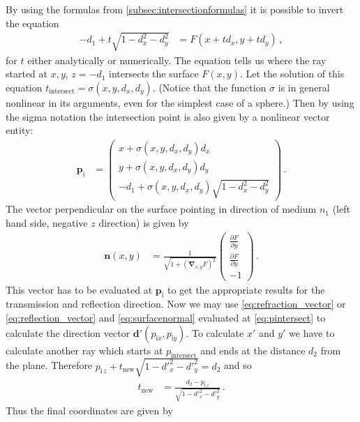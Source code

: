 \documentclass[12pt,a4paper,twoside,openright,BCOR10mm,headsepline,titlepage,abstracton,chapterprefix,final]{scrreprt}
\newcommand\Vector[1]{{\mathbf{#1}}}
\begin{document}
By using the formulas from \ref{subsec:intersectionformulas} it is possible to invert the equation 
\begin{align}
-d_1 + t \sqrt{1-d_x^2-d_y^2} &= F(x + t d_x, y + t d_y)\,,\label{eq:genintersection} 
\end{align}
for $t$ either analytically or numerically. The equation tells
us where the ray started at $x, y$, $z = -d_1$ intersects the surface $F(x, y)$. Let the solution
of this equation $t_\text{intersect} = \sigma(x, y, d_x, d_y)$. (Notice that the function $\sigma$
is in general nonlinear in its arguments, even for the simplest case of a sphere.) Then by using the 
sigma notation the intersection point is also given by a nonlinear vector entity:
\begin{align}
 \Vector{p}_\text{i} &= \begin{pmatrix} x + \sigma(x,y,d_x,d_y) d_x \\ y + \sigma(x,y,d_x,d_y) d_y \\ -d_1 + \sigma(x,y,d_x,d_y) \sqrt{1 - d_x^2 - d_y^2} \end{pmatrix}\,.\label{eq:pintersect}
\end{align}
The vector perpendicular on the surface pointing in direction of medium $n_1$ (left hand side, negative $z$ direction) is given
by
\begin{align}
 \Vector{n}(x, y) &= 
  \frac{1}{\sqrt{1 + (\Vector{\nabla}_{x,y} F)^2}} 
  \begin{pmatrix} \frac{\partial F}{\partial y} \\ \frac{\partial F}{\partial y} \\ -1 \end{pmatrix}\,.\label{eq:surfacenormal}
\end{align}
This vector has to be evaluated at $\Vector{p}_\text{i}$ to get the appropriate results for
the transmission and reflection direction. Now we may use \eqref{eq:refraction_vector} or \eqref{eq:reflection_vector}
and \eqref{eq:surfacenormal} evaluated at \eqref{eq:pintersect} to calculate the direction vector $\Vector{d}'(p_{\text{i} x}, p_{\text{i} y})$.
To calculate $x'$ and $y'$ we have to calculate another ray which starts at $p_\text{intersect}$ and ends at the
distance $d_2$ from the plane. Therefore $p_{\text{i}\,z} + t_\text{new} \sqrt{1 - {d'}_x^2 - {d'}_y^2} = d_2$ and so
\begin{align}
t_\text{new} &= \frac{d_2 - p_{\text{i}\,z}}{\sqrt{1 - {d'}_x^2 - {d'}_y^2}}\,.
\end{align}
Thus the final coordinates are given by
\end{document}
